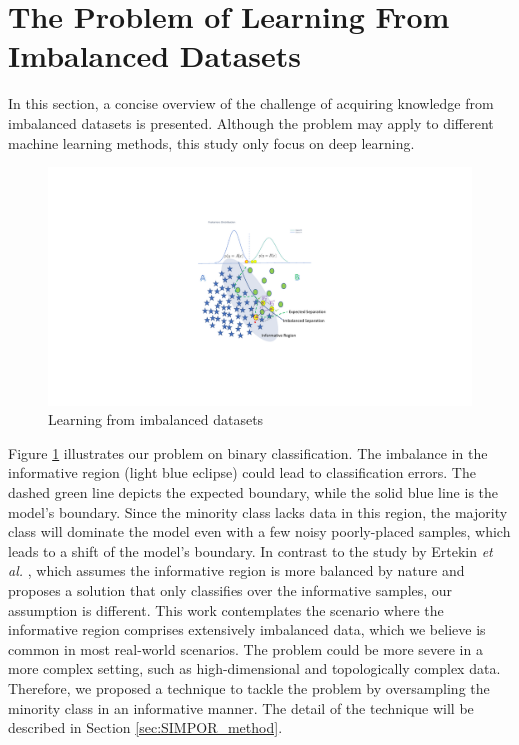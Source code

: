 \documentclass[journal]{IEEEtai}
\begin{document}
\section{The Problem of Learning From Imbalanced Datasets}
\label{sec:problem}
In this section, a concise overview of the challenge of acquiring knowledge from imbalanced datasets is presented. Although the problem may apply to different machine learning methods, this study only focus on deep learning. 

\begin{figure}[t!]
	\includegraphics[width=\linewidth, trim=300 150 310 120,clip]{Figures/proplem.pdf}
	\caption{Learning from imbalanced datasets}
	\label{fig:problem}
\end{figure}

Figure \ref{fig:problem} illustrates our problem on binary classification. The imbalance in the informative region (light blue eclipse) could lead to classification errors. The dashed green line depicts the expected boundary, while the solid blue line is the model's boundary. Since the minority class lacks data in this region, the majority class will dominate the model even with a few noisy poorly-placed samples, which leads to a shift of the model's boundary. In contrast to the study by Ertekin \textit{et al.} \cite{ertekin_learning_2007}, which assumes the informative region is more balanced by nature and proposes a solution that only classifies over the informative samples, our assumption is different. This work contemplates the scenario where the informative region comprises extensively imbalanced data, which we believe is common in most real-world scenarios. The problem could be more severe in a more complex setting, such as high-dimensional and topologically complex data. Therefore, we proposed a technique to tackle the problem by oversampling the minority class in an informative manner. The detail of the technique will be described in Section \ref{sec:SIMPOR_method}.         
\end{document}
